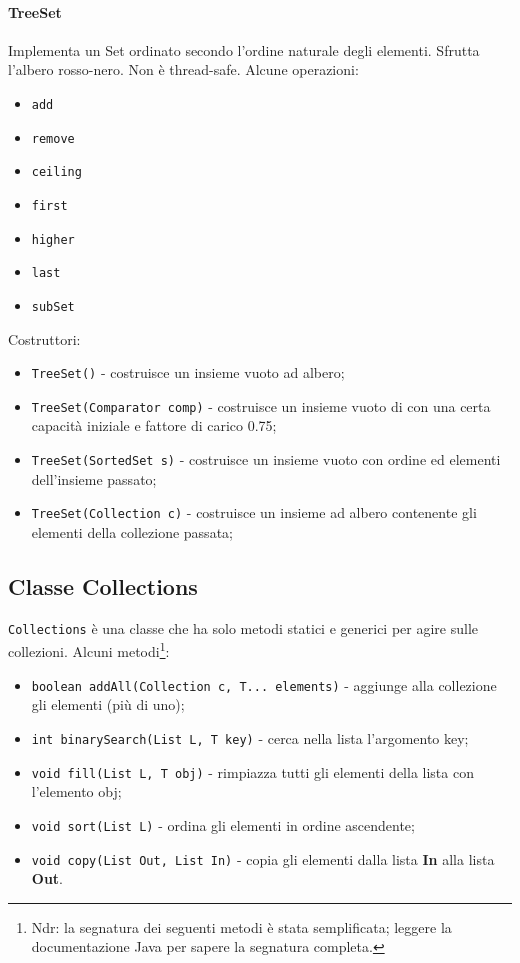 \paragraph{TreeSet}
Implementa un Set ordinato secondo l'ordine naturale degli elementi. Sfrutta l'albero rosso-nero. Non è thread-safe. Alcune operazioni:
\begin{itemize}
\item \texttt{add}
\item \texttt{remove}
\item \texttt{ceiling}
\item \texttt{first}
\item \texttt{higher}
\item \texttt{last}
\item \texttt{subSet}
\end{itemize}
Costruttori:
\begin{itemize}
\item \texttt{TreeSet()} - costruisce un insieme vuoto ad albero;
\item \texttt{TreeSet(Comparator comp)} - costruisce un insieme vuoto di con una certa capacità iniziale e fattore di carico 0.75;
\item \texttt{TreeSet(SortedSet s)} - costruisce un insieme vuoto con ordine ed elementi dell'insieme passato;
\item \texttt{TreeSet(Collection c)} - costruisce un insieme ad albero contenente gli elementi della collezione passata;
\end{itemize}

\subsection{Classe Collections}
\texttt{Collections} è una classe che ha solo metodi statici e generici per agire sulle collezioni. Alcuni metodi\footnote{Ndr: la segnatura dei seguenti metodi è stata semplificata; leggere la documentazione Java per sapere la segnatura completa.}:
\begin{itemize}
\item \texttt{boolean addAll(Collection c, T... elements)} - aggiunge alla collezione gli elementi (più di uno);
\item \texttt{int binarySearch(List L, T key)} - cerca nella lista l'argomento key; 
\item \texttt{void fill(List L, T obj)} - rimpiazza tutti gli elementi della lista con l'elemento obj;
\item \texttt{void sort(List L)} - ordina gli elementi in ordine ascendente;
\item \texttt{void copy(List Out, List In)} - copia gli elementi dalla lista \textbf{In} alla lista \textbf{Out}.
\end{itemize}


